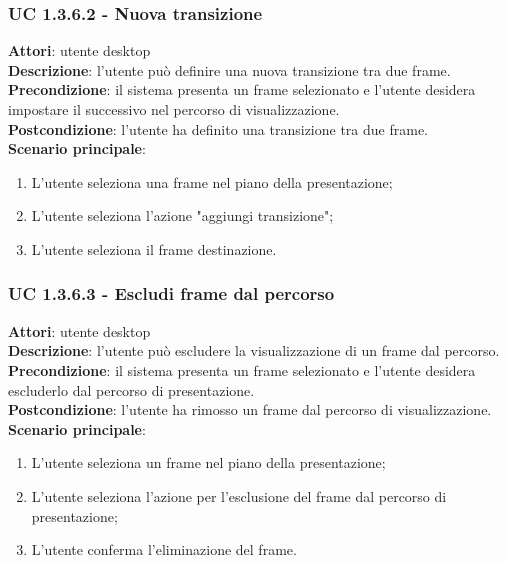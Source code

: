 \subsubsection{UC 1.3.6.2 - Nuova transizione}{
	\label{uc1.3.6.2}
	\textbf{Attori}: utente desktop \\
	\textbf{Descrizione}: l'utente può definire una nuova transizione tra due frame. \\
	\textbf{Precondizione}: il sistema presenta un frame selezionato e l'utente desidera impostare il successivo nel percorso di visualizzazione.	\\
	\textbf{Postcondizione}: l'utente ha definito una transizione tra due frame.	\\
	\textbf{Scenario principale}:
	\begin{enumerate}
		\item L'utente seleziona una frame nel piano della presentazione;
		\item L'utente seleziona l'azione "aggiungi transizione";
		\item L'utente seleziona il frame destinazione.
	\end{enumerate}
}
\subsubsection{UC 1.3.6.3 - Escludi frame dal percorso}{
	\label{uc1.3.6.3}
	\textbf{Attori}: utente desktop \\
	\textbf{Descrizione}: l'utente può escludere la visualizzazione di un frame dal percorso. \\
	\textbf{Precondizione}: il sistema presenta un frame selezionato e l'utente desidera escluderlo dal percorso di presentazione.	\\
	\textbf{Postcondizione}: l'utente ha rimosso un frame dal percorso di visualizzazione.	\\
	\textbf{Scenario principale}:
	\begin{enumerate}
		\item L'utente seleziona un frame nel piano della presentazione;
		\item L'utente seleziona l'azione per l'esclusione del frame dal percorso di presentazione;
		\item L'utente conferma l'eliminazione del frame.
	\end{enumerate}
}
